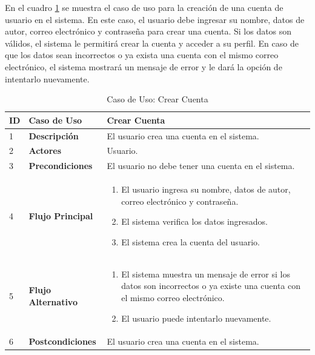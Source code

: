 En el cuadro \ref{tab:caso-uso-crear-cuenta} se muestra el caso de uso para la creación de una cuenta de usuario en el sistema. En este caso, el usuario debe ingresar su nombre, datos de autor, correo electrónico y contraseña para crear una cuenta. Si los datos son válidos, el sistema le permitirá crear la cuenta y acceder a su perfil. En caso de que los datos sean incorrectos o ya exista una cuenta con el mismo correo electrónico, el sistema mostrará un mensaje de error y le dará la opción de intentarlo nuevamente.

\begin{table}[H]
    \centering
        \begin{tabular}{|p{0.5cm}|p{3.5cm}|p{10cm}|}
        \hline
        \textbf{ID} & \textbf{Caso de Uso} & \textbf{Crear Cuenta} \\
        \hline
        1 & \textbf{Descripción} & El usuario crea una cuenta en el sistema. \\
        \hline
        2 & \textbf{Actores} & Usuario. \\
        \hline
        3 & \textbf{Precondiciones} & El usuario no debe tener una cuenta en el sistema. \\
        \hline
        4 & \textbf{Flujo Principal} & 
        \begin{enumerate}
            \item El usuario ingresa su nombre, datos de autor, correo electrónico y contraseña.
            \item El sistema verifica los datos ingresados.
            \item El sistema crea la cuenta del usuario.
        \end{enumerate} \\
        \hline
        5 & \textbf{Flujo Alternativo} & 
        \begin{enumerate}
            \item El sistema muestra un mensaje de error si los datos son incorrectos o ya existe una cuenta con el mismo correo electrónico.
            \item El usuario puede intentarlo nuevamente.
        \end{enumerate} \\
        \hline
        6 & \textbf{Postcondiciones} & El usuario crea una cuenta en el sistema. \\
        \hline
    \end{tabular}
    \caption{Caso de Uso: Crear Cuenta}
    \label{tab:caso-uso-crear-cuenta}
\end{table}

